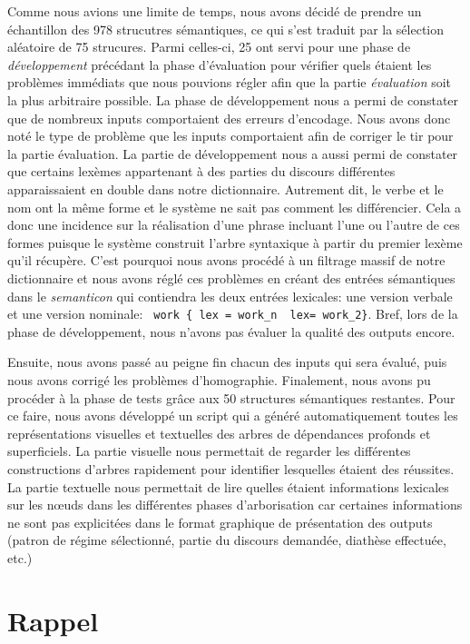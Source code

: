 Comme nous avions une limite de temps, nous avons décidé de prendre un échantillon des 978 strucutres sémantiques, ce qui s'est traduit par la sélection aléatoire de 75 strucures. Parmi celles-ci, 25 ont servi pour une phase de \emph{développement} précédant la phase d'évaluation pour vérifier quels étaient les problèmes immédiats que nous pouvions régler afin que la partie \emph{évaluation} soit la plus arbitraire possible. La phase de développement nous a permi de constater que de nombreux inputs comportaient des erreurs d'encodage. Nous avons donc noté le type de problème que les inputs comportaient afin de corriger le tir pour la partie évaluation. La partie de développement nous a aussi permi de constater que certains lexèmes appartenant à des parties du discours différentes apparaissaient en double dans notre dictionnaire. Autrement dit, le verbe  et le nom  ont la même forme et le système ne sait pas comment les différencier. Cela a donc une incidence sur la réalisation d'une phrase incluant l'une ou l'autre de ces formes puisque le système construit l'arbre syntaxique à partir du premier lexème qu'il récupère. C'est pourquoi nous avons procédé à un filtrage massif de notre dictionnaire et nous avons réglé ces problèmes en créant des entrées sémantiques dans le \emph{semanticon} qui contiendra les deux entrées lexicales: une version verbale et une version nominale: \lstinline! work { lex = work_n  lex= work_2}!. Bref, lors de la phase de développement, nous n'avons pas évaluer la qualité des outputs encore.

Ensuite, nous avons passé au peigne fin chacun des inputs qui sera évalué, puis nous avons corrigé les problèmes d'homographie. Finalement, nous avons pu procéder à la phase de tests grâce aux 50 structures sémantiques restantes. Pour ce faire, nous avons développé un script qui a généré automatiquement toutes les représentations visuelles et textuelles des arbres de dépendances profonds et superficiels. La partie visuelle nous permettait de regarder les différentes constructions d'arbres rapidement pour identifier lesquelles étaient des réussites. La partie textuelle nous permettait de lire quelles étaient informations lexicales sur les n\oe{}uds dans les différentes phases d'arborisation car certaines informations ne sont pas explicitées dans le format graphique de présentation des outputs (patron de régime sélectionné, partie du discours demandée, diathèse effectuée, etc.)
                              
\section{Rappel}

